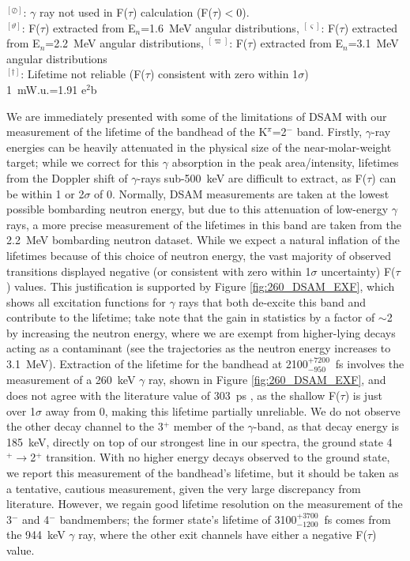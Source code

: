 \begin{landscape}
{\small $^{[\oslash]}$: $\gamma$ ray not used in F($\tau$) calculation (F($\tau$)$<$0).}\\
{\small $^{[\vartheta]}$: F($\tau$) extracted from E$_n$=1.6~MeV angular distributions},
{\small $^{[\varsigma]}$: F($\tau$) extracted from E$_n$=2.2~MeV angular distributions},
{\small $^{[\varpi]}$: F($\tau$) extracted from E$_n$=3.1~MeV angular distributions}\\
{\small $^{[\dagger]}$: Lifetime not reliable (F($\tau$) consistent with zero within 1$\sigma$)}\\
{\small 1~mW.u.=1.91 e$^2$b}
\end{landscape}


We are immediately presented with some of the limitations of DSAM with our measurement of the lifetime of the bandhead of the K$^\pi$=2$^-$ band. Firstly, $\gamma$-ray energies can be heavily attenuated in the physical size of the near-molar-weight target; while we correct for this $\gamma$ absorption in the peak area/intensity, lifetimes from the Doppler shift of $\gamma$-rays sub-500~keV are difficult to extract, as F($\tau$) can be within 1 or 2$\sigma$ of 0. Normally, DSAM measurements are taken at the lowest possible bombarding neutron energy, but due to this attenuation of low-energy $\gamma$ rays, a more precise measurement of the lifetimes in this band are taken from the 2.2~MeV bombarding neutron dataset. While we expect a natural inflation of the lifetimes because of this choice of neutron energy, the vast majority of observed transitions displayed negative (or consistent with zero within 1$\sigma$ uncertainty) F($\tau$) values. This justification is supported by Figure \ref{fig:260_DSAM_EXF}, which shows all excitation functions for $\gamma$ rays that both de-excite this band and contribute to the lifetime; take note that the gain in statistics by a factor of $\sim$2 by increasing the neutron energy, where we are exempt from higher-lying decays acting as a contaminant (see the trajectories as the neutron energy increases to 3.1~MeV). Extraction of the lifetime for the bandhead at 2100$^{+7200}_{-950}$~fs involves the measurement of a 260~keV $\gamma$ ray, shown in Figure \ref{fig:260_DSAM_EXF}, and does not agree with the literature value of 303~ps \cite{PhysRev.166.1227}, as the shallow F($\tau$) is just over 1$\sigma$ away from 0, making this lifetime partially unreliable. We do not observe the other decay channel to the 3$^+$ member of the $\gamma$-band, as that decay energy is 185~keV, directly on top of our strongest line in our spectra, the ground state 4$^+\rightarrow$2$^+$ transition. With no higher energy decays observed to the ground state, we report this measurement of the bandhead's lifetime, but it should be taken as a tentative, cautious measurement, given the very large discrepancy from literature. However, we regain good lifetime resolution on the measurement of the 3$^-$ and 4$^-$ bandmembers; the former state's lifetime of 3100$^{+3700}_{-1200}$~fs comes from the 944~keV $\gamma$ ray, where the other exit channels have either a negative F($\tau$) value. 

